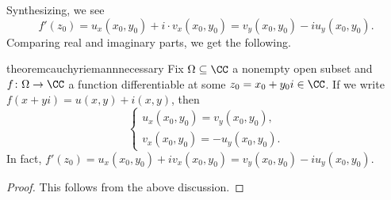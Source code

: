 Synthesizing, we see
\[f'(z_0)=u_x(x_0,y_0)+i\cdot v_x(x_0,y_0)=v_y(x_0,y_0)-iu_y(x_0,y_0).\]
Comparing real and imaginary parts, we get the following.
\begin{restatable}{theorem}{cauchyriemannnecessary} \label{thm:crnecessary}
	Fix $\Omega\subseteq\CC$ a nonempty open subset and $f\colon \Omega\to\CC$ a function differentiable at some $z_0=x_0+y_0i\in\CC$. If we write $f(x+yi)=u(x,y)+i(x,y)$, then
	\[\begin{cases}
		u_x(x_0,y_0)=v_y(x_0,y_0), \\
		v_x(x_0,y_0)=-u_y(x_0,y_0).
	\end{cases}\]
	In fact, $f'(z_0)=u_x(x_0,y_0)+iv_x(x_0,y_0)=v_y(x_0,y_0)-iu_y(x_0,y_0)$.
\end{restatable}
\begin{proof}
	This follows from the above discussion.
\end{proof}

